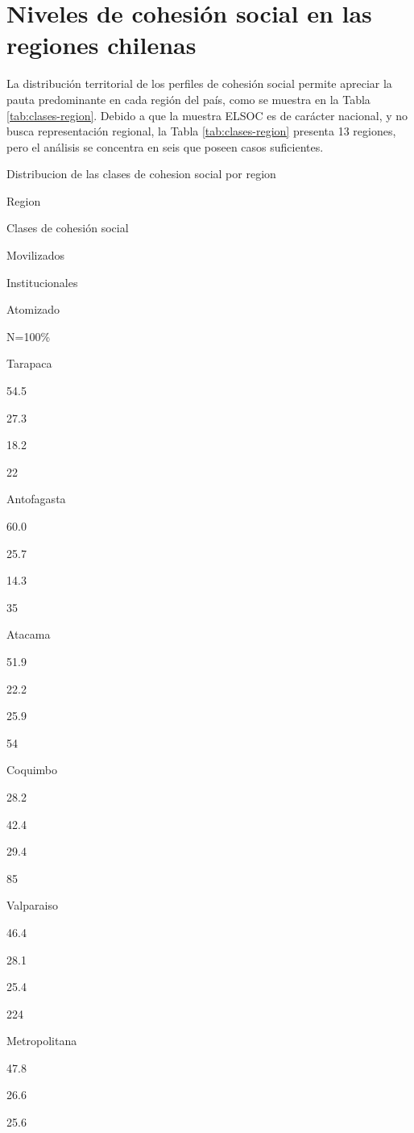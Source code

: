 \documentclass[
  12pt,
]{book}
\begin{document}
\hypertarget{niveles-de-cohesiuxf3n-social-en-las-regiones-chilenas}{%
\section{Niveles de cohesión social en las regiones chilenas}\label{niveles-de-cohesiuxf3n-social-en-las-regiones-chilenas}}

La distribución territorial de los perfiles de cohesión social permite apreciar la pauta predominante en cada región del país, como se muestra en la Tabla \ref{tab:clases-region}. Debido a que la muestra ELSOC es de carácter nacional, y no busca representación regional, la Tabla \ref{tab:clases-region} presenta 13 regiones, pero el análisis se concentra en seis que poseen casos suficientes.

\label{tab:clases-region}Distribucion de las clases de cohesion social por region

Region

Clases de cohesión social

Movilizados

Institucionales

Atomizado

N=100\%

Tarapaca

54.5

27.3

18.2

22

Antofagasta

60.0

25.7

14.3

35

Atacama

51.9

22.2

25.9

54

Coquimbo

28.2

42.4

29.4

85

Valparaiso

46.4

28.1

25.4

224

Metropolitana

47.8

26.6

25.6
\end{document}
